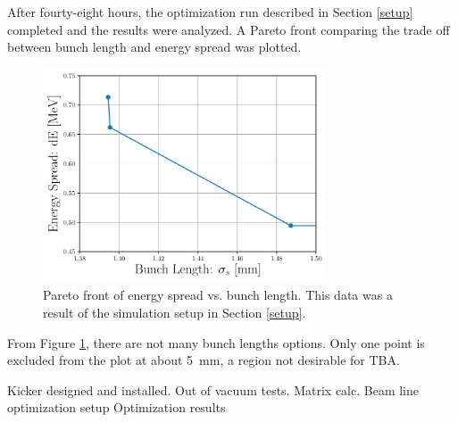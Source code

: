 After fourty-eight hours, the optimization run described in Section \ref{setup}
completed and the results were analyzed. 
A Pareto front comparing the trade off between bunch length and energy spread was plotted.
\begin{figure}
	\centering
	\includegraphics[width=0.75\textwidth]{./images/dE_vs_zrms_pareto_front_quads_before_Q5}
	\caption{Pareto front of energy spread vs. bunch length.
	This data was a result of the simulation setup in Section \ref{setup}.}
\label{fig:tba-pareto}
\end{figure}
From Figure \ref{fig:tba-pareto}, there are not many bunch lengths options.
Only one point is excluded from the plot at about \SI{5}{mm}, a region 
not desirable for TBA. 









Kicker designed and installed.
Out of vacuum tests.
Matrix calc.
Beam line optimization setup
Optimization results
 












